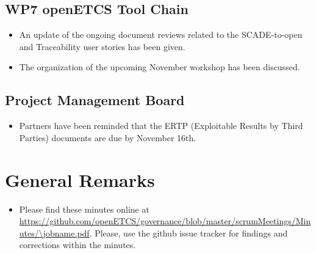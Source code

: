 \documentclass[a4paper, 11pt]{article}
\begin{document}
\subsection{WP7 openETCS Tool Chain}
\begin{itemize}
\item An update of the ongoing document reviews related to the SCADE-to-open and Traceability user stories has been given.
\item The organization of the upcoming November workshop has been discussed.
\end{itemize}

\subsection{Project Management Board}
\begin{itemize}
\item Partners have been reminded that the ERTP (Exploitable Results by Third Parties) documents are due by November 16th.
\end{itemize}


\section{General Remarks}

\begin{itemize}
\item Please find these minutes online at \url{https://github.com/openETCS/governance/blob/master/scrumMeetings/Minutes/\jobname.pdf}. Please, use the github issue tracker for findings and corrections within the minutes.
\end{itemize}
\end{document}
